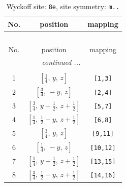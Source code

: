 \documentclass[fleqn,8pt]{jsarticle}
\begin{document}
\begin{longtable}{ccc}
\caption{Wyckoff site: {\tt 8e}, site symmetry: {\tt m..}}
 \\
 \hline \hline
No. & position & mapping \\ \hline \endfirsthead

\multicolumn{2}{l}{\tablename\ \thetable{}} \\
 \hline \hline
No. & position & mapping \\ \hline \endhead

 \hline \hline
\multicolumn{2}{r}{\footnotesize\it continued ...} \\ \endfoot

 \hline \hline
\multicolumn{2}{r}{} \\ \endlastfoot

1 & $\left[ \frac{1}{4},\, y,\, z \right]$ & {\tt [1,3]} \\ \hline
2 & $\left[ \frac{3}{4},\, - y,\, z \right]$ & {\tt [2,4]} \\ \hline
3 & $\left[ \frac{3}{4},\, y + \frac{1}{2},\, z + \frac{1}{2} \right]$ & {\tt [5,7]} \\ \hline
4 & $\left[ \frac{1}{4},\, \frac{1}{2} - y,\, z + \frac{1}{2} \right]$ & {\tt [6,8]} \\ \hline
5 & $\left[ \frac{3}{4},\, y,\, z \right]$ & {\tt [9,11]} \\ \hline
6 & $\left[ \frac{1}{4},\, - y,\, z \right]$ & {\tt [10,12]} \\ \hline
7 & $\left[ \frac{1}{4},\, y + \frac{1}{2},\, z + \frac{1}{2} \right]$ & {\tt [13,15]} \\ \hline
8 & $\left[ \frac{3}{4},\, \frac{1}{2} - y,\, z + \frac{1}{2} \right]$ & {\tt [14,16]} \\
\end{longtable}
\renewcommand{\arraystretch}{1.2}
\end{document}
